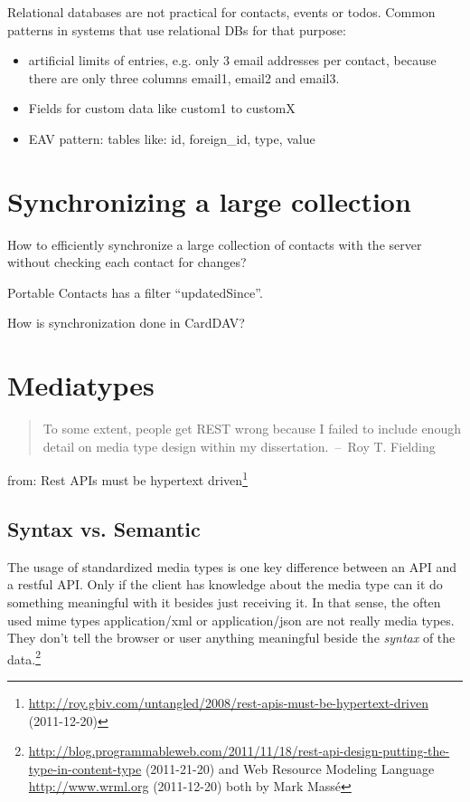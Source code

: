 \documentclass[12pt,a4paper]{scrartcl}		%
\newcommand{\citeurl}[2]{\url{#1} (#2)}
\begin{document}
Relational databases are not practical for contacts, events or todos. Common patterns in systems that use relational DBs for that purpose:
\begin{itemize}
\item artificial limits of entries, e.g. only 3 email addresses per contact, because there are only three columns email1, email2 and email3.
\item Fields for custom data like custom1 to customX
\item EAV pattern: tables like: id, foreign\_id, type, value
\end{itemize}
\section{Synchronizing a large collection}

How to efficiently synchronize a large collection of contacts with the server without checking each contact for changes?

Portable Contacts has a filter ``updatedSince''.

How is synchronization done in CardDAV?

\section{Mediatypes}

\begin{quote}
  To some extent, people get REST wrong because I failed to include enough
  detail on media type design within my dissertation.~--~Roy T. Fielding
\end{quote}
from: Rest APIs must be hypertext driven\footnote
  {\citeurl{http://roy.gbiv.com/untangled/2008/rest-apis-must-be-hypertext-driven}{2011-12-20}}

\subsection{Syntax vs. Semantic}

The usage of standardized media types is one key difference between an API and a
restful API. \cite[sec. 5.2.1.2]{Fielding2000} Only if the client has knowledge
about the media type can it do something meaningful with it besides just
receiving it. In that sense, the often used mime types application/xml or
application/json are not really media types. They don't tell the browser or user
anything meaningful beside the \emph{syntax} of the data.\footnote{
\citeurl{http://blog.programmableweb.com/2011/11/18/rest-api-design-putting-the-type-in-content-type}{2011-21-20}
and Web Resource Modeling Language \citeurl{http://www.wrml.org}{2011-12-20} both by Mark Massé
}
\end{document}
